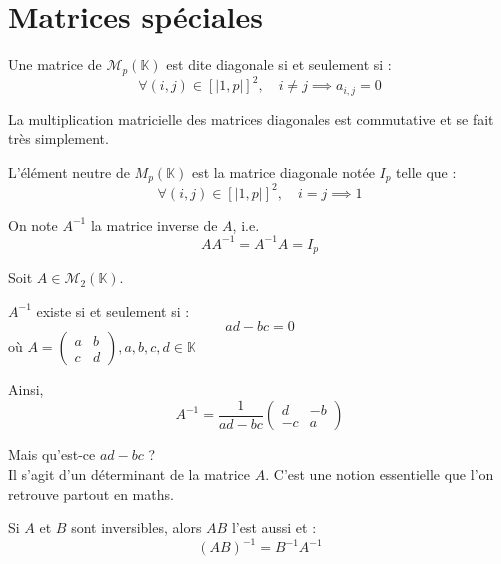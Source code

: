 \documentclass[a4paper, titlepage]{article}
\newenvironment{lititle}%
{\vspace{7mm}\LobsterTwo \large}%
{\\}
\begin{document}
	\section{Matrices spéciales}
	\begin{defn}
		Une matrice de $\mathcal{M}_{p}(\mathbb{K})$ est dite diagonale si et seulement si :
		$$ \forall (i,j)\in[|1,p|]^2,\quad i\neq j \implies a_{i,j} = 0 $$
	\end{defn}
	\begin{props}
		La multiplication matricielle des matrices diagonales est commutative et se fait très simplement.
	\end{props}
	\begin{props}
		L'élément neutre de $M_p(\mathbb{K})$ est la matrice diagonale notée $I_p$ telle que :
		$$ \forall (i,j)\in[|1,p|]^2,\quad i=j\implies 1 $$
	\end{props}
	\begin{defn}
		On note $A^{-1}$ la matrice inverse de $A$, i.e.
		$$ A A^{-1} = A^{-1} A = I_p $$
	\end{defn}
	\begin{thm}
		Soit $A\in\mathcal{M}_2(\mathbb{K})$.

		$A^{-1}$ existe si et seulement si :
		$$ ad-bc = 0 $$
		où $A = \begin{pmatrix} a&b\\c&d \end{pmatrix}, a,b,c,d\in\mathbb{K}$

		Ainsi,
		$$ A^{-1} = \frac{1}{ad-bc}\begin{pmatrix} d&-b\\-c&a \end{pmatrix} $$
	\end{thm}
	\begin{lititle}
		Mais qu'est-ce $ad-bc$ ?
	\end{lititle}
	Il s'agit d'un déterminant de la matrice $A$. C'est une notion essentielle que l'on retrouve partout en maths.

	\begin{thm}
		Si $A$ et $B$ sont inversibles, alors $AB$ l'est aussi et :
		$$ (AB)^{-1} = B^{-1}A^{-1} $$
	\end{thm}
\end{document}
